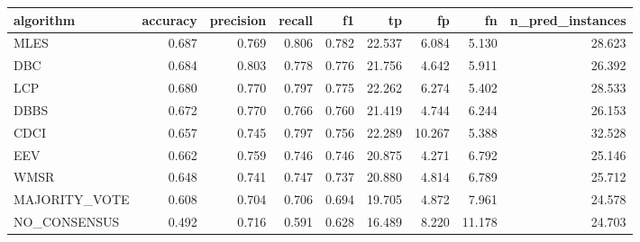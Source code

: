 \begin{tabular}{lrrrrrrrr}
\toprule
algorithm & accuracy & precision & recall & f1 & tp & fp & fn & n_pred_instances \\
\midrule
MLES & 0.687 & 0.769 & 0.806 & 0.782 & 22.537 & 6.084 & 5.130 & 28.623 \\
DBC & 0.684 & 0.803 & 0.778 & 0.776 & 21.756 & 4.642 & 5.911 & 26.392 \\
LCP & 0.680 & 0.770 & 0.797 & 0.775 & 22.262 & 6.274 & 5.402 & 28.533 \\
DBBS & 0.672 & 0.770 & 0.766 & 0.760 & 21.419 & 4.744 & 6.244 & 26.153 \\
CDCI & 0.657 & 0.745 & 0.797 & 0.756 & 22.289 & 10.267 & 5.388 & 32.528 \\
EEV & 0.662 & 0.759 & 0.746 & 0.746 & 20.875 & 4.271 & 6.792 & 25.146 \\
WMSR & 0.648 & 0.741 & 0.747 & 0.737 & 20.880 & 4.814 & 6.789 & 25.712 \\
MAJORITY_VOTE & 0.608 & 0.704 & 0.706 & 0.694 & 19.705 & 4.872 & 7.961 & 24.578 \\
NO_CONSENSUS & 0.492 & 0.716 & 0.591 & 0.628 & 16.489 & 8.220 & 11.178 & 24.703 \\
\bottomrule
\end{tabular}
